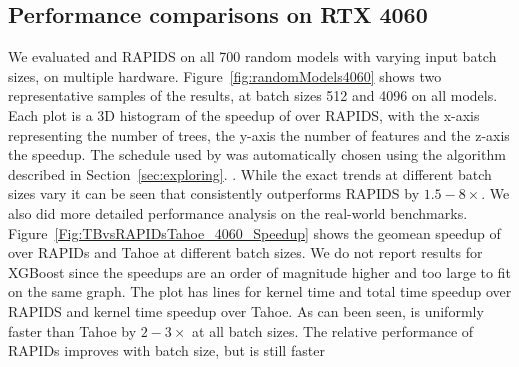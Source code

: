 \subsection{Performance comparisons on RTX 4060}
We evaluated \Treebeard{} and RAPIDS on all 700 random models with varying input batch sizes, on multiple hardware.   
Figure~\ref{fig:randomModels4060} shows two representative samples of the results, at batch sizes 512 and 4096 on all models. 
Each plot is a 3D histogram of the speedup of \Treebeard{} over RAPIDS, with the x-axis representing the number of trees, the y-axis the number of features and the z-axis the speedup. 
The schedule used by \Treebeard{} was automatically chosen using the algorithm described in Section~\ref{sec:exploring}. .
While the exact trends at different batch sizes vary it can be seen that \Treebeard{} consistently outperforms RAPIDS by $1.5-8\times$. 
We also did more detailed performance analysis on the real-world benchmarks.
Figure~\ref{Fig:TBvsRAPIDsTahoe_4060_Speedup} shows the geomean speedup of \Treebeard{} over RAPIDs 
and Tahoe at different batch sizes. We do not report results for XGBoost since the speedups are an 
order of magnitude higher and too large to fit on the same graph.
The plot has lines for kernel time and total time speedup over RAPIDS and kernel time speedup over Tahoe. 
As can been seen, \Treebeard{} is uniformly faster than Tahoe by $2-3\times$ at all batch sizes. 
The relative performance of RAPIDs improves with batch size, but \Treebeard{} is still faster 

